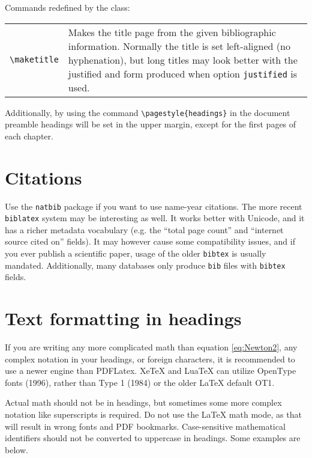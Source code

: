 \documentclass[twoside,draftfooter]{tutthesis} %
\begin{document}
Commands redefined by the class:

\begin{tabular}[h]{@{} p{} p{} @{}}
  \verb|\maketitle| & Makes the title page from the given bibliographic information. Normally the title is set left-aligned (no hyphenation), but long titles may look better with the justified and form produced when option \texttt{justified} is used.
\end{tabular}

Additionally, by using the command \verb|\pagestyle{headings}| in the document preamble headings will be set in the upper margin, except for the first pages of each chapter.

\section{Citations}
Use the \texttt{natbib} package if you want to use name-year citations.
The more recent \texttt{biblatex} system may be interesting as well.
It works better with Unicode, and it has a richer metadata vocabulary (e.g. the ``total page count'' and ``internet source cited on'' fields).
It may however cause some compatibility issues, and if you ever publish a scientific paper, usage of the older \texttt{bibtex} is usually mandated.
Additionally, many databases only produce \texttt{bib} files with \texttt{bibtex} fields.


\section{Text formatting in headings}

If you are writing any more complicated math than equation \eqref{eq:Newton2}, any complex notation in your headings, or foreign characters, it is recommended to use a newer engine than PDFLatex.
XeTeX and LuaTeX can utilize OpenType fonts (1996), rather than Type 1 (1984) or the older LaTeX default OT1.

Actual math should not be in headings, but sometimes some more complex notation like superscripts is required.
Do not use the LaTeX math mode, as that will result in wrong fonts and PDF bookmarks.
Case-sensitive mathematical identifiers should not be converted to uppercase in headings.
Some examples are below.
\end{document}
